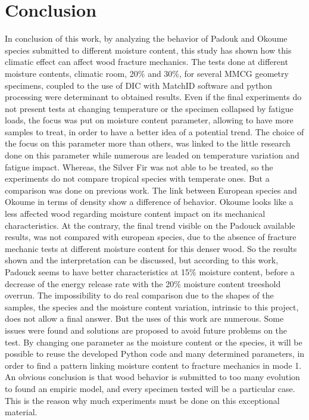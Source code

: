 
\chapter{Conclusion} %

\label{Conclusion} %


In conclusion of this work, by analyzing the behavior of Padouk and Okoume species submitted to different moisture content, this study has shown how this climatic effect can affect wood fracture mechanics.
\newline
The tests done at different moisture contents, climatic room, 20\% and 30\%, for several MMCG geometry specimens, coupled to the use of DIC with MatchID software and python processing were determinant to obtained results. Even if the final experiments do not present tests at changing temperature or the specimen collapsed by fatigue loads, the focus was put on moisture content parameter, allowing to have more samples to treat, in order to have a better idea of a potential trend. The choice of the focus on this parameter more than others, was linked to the little research done on this parameter while numerous are leaded on temperature variation and fatigue impact. Whereas, the Silver Fir was not able to be treated, so the experiments do not compare tropical species with temperate ones. But a comparison was done on previous work. 
The link between European species and Okoume in terms of density show a difference of behavior. Okoume looks like a less affected wood regarding moisture content impact on its mechanical characteristics. At the contrary, the final trend visible on the Padouck available results, was not compared with european species, due to the absence of fracture mechanic tests at different moisture content for this denser wood. So the results shown and the interpretation can be discussed, but according to this work, Padouck seems to have better characteristics at 15\% moisture content, before a decrease of the energy release rate with the 20\% moisture content treeshold overrun. 
\newline
The impossibility to do real comparison due to the shapes of the samples, the species and the moisture content variation, intrinsic to this project, does not allow a final answer. But the uses of this work are numerous. Some issues were found and solutions are proposed to avoid future problems on the test. By changing one parameter as the moisture content or the species, it will be possible to reuse the developed Python code and many determined parameters, in order to find a pattern linking moisture content to fracture mechanics in mode 1. An obvious conclusion is that wood behavior is submitted to too many evolution to found an empiric model, and every specimen tested will be a particular case. This is the reason why much experiments must be done on this exceptional material.